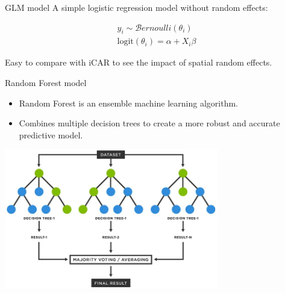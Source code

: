 \documentclass[10pt,table,dvipsnames,compress]{beamer}
\begin{document}
\begin{frame}[label={sec:org2ef0ac7}]{GLM model}
A simple logistic regression model without random effects:

\begin{equation*}
\begin{split}
  y_i \sim \mathcal{B}ernoulli(\theta_i)\\
  \text{logit}(\theta_i) = \alpha + X_i \beta
\end{split}
\end{equation*}

Easy to compare with iCAR to see the impact of spatial random effects.
\end{frame}

\begin{frame}[label={sec:orgbf834e3}]{Random Forest model}
\begin{itemize}
\item Random Forest is an ensemble machine learning algorithm.
\item Combines multiple decision trees to create a more robust and accurate predictive model.
\end{itemize}

\begin{center}
\includegraphics[width=0.7\textwidth]{figs/random_forest.png}
\end{center}
\end{frame}
\end{document}
